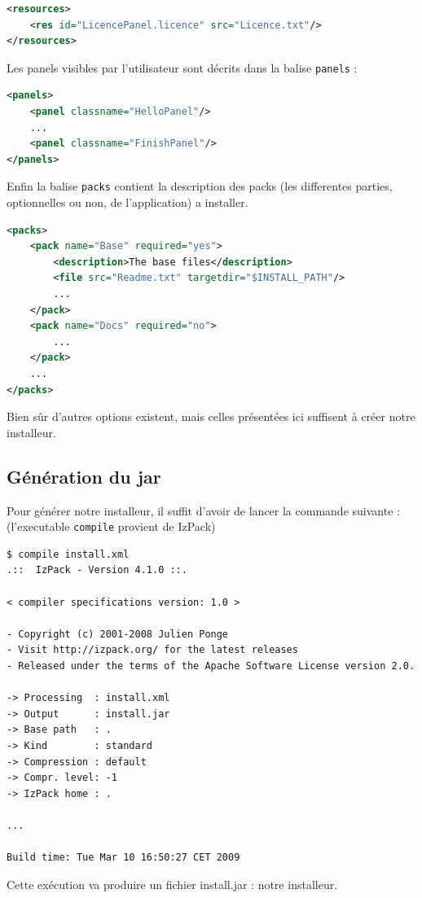 \begin{lstlisting}[language=xml]
<resources>
	<res id="LicencePanel.licence" src="Licence.txt"/>
</resources>
\end{lstlisting}
Les panels visibles par l'utilisateur sont décrits dans la balise \verb|panels| :
\begin{lstlisting}[language=xml]
<panels>
	<panel classname="HelloPanel"/>
	...
	<panel classname="FinishPanel"/>
</panels>
\end{lstlisting}
Enfin la balise \verb|packs| contient la description des packs (les differentes parties, optionnelles ou non, de l'application) a installer.
\begin{lstlisting}[language=xml]
<packs>
	<pack name="Base" required="yes">
		<description>The base files</description>
		<file src="Readme.txt" targetdir="$INSTALL_PATH"/>
		...
	</pack>
	<pack name="Docs" required="no">
		...
	</pack>
	...
</packs>
\end{lstlisting}
Bien sûr d'autres options existent, mais celles présentées ici suffisent à créer notre installeur.
\subsection{Génération du jar}
Pour générer notre installeur, il suffit d'avoir de lancer la commande suivante : (l'executable \verb|compile| provient de IzPack)
\begin{verbatim}
$ compile install.xml
.::  IzPack - Version 4.1.0 ::.

< compiler specifications version: 1.0 >

- Copyright (c) 2001-2008 Julien Ponge
- Visit http://izpack.org/ for the latest releases
- Released under the terms of the Apache Software License version 2.0.

-> Processing  : install.xml
-> Output      : install.jar
-> Base path   : .
-> Kind        : standard
-> Compression : default
-> Compr. level: -1
-> IzPack home : .

...

Build time: Tue Mar 10 16:50:27 CET 2009
\end{verbatim}
Cette exécution va produire un fichier install.jar : notre installeur.
